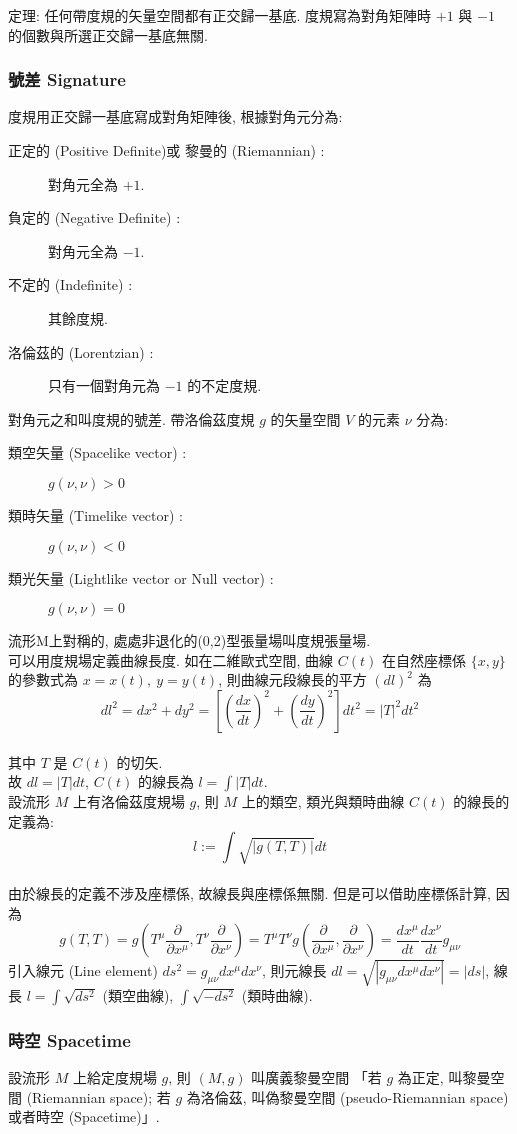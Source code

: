 \documentclass{article}
\begin{document}
\begin{CJK}{UTF8}{bsmi}
定理: 任何帶度規的矢量空間都有正交歸一基底. 度規寫為對角矩陣時 $+1$ 與 $-1$ 的個數與所選正交歸一基底無關.
\subsubsection{號差 Signature}
度規用正交歸一基底寫成對角矩陣後, 根據對角元分為:\begin{description}
  \item[正定的 (Positive Definite)或 黎曼的 (Riemannian) :] 對角元全為 $+1$.
  \item[負定的 (Negative Definite) :] 對角元全為 $-1$.
  \item[不定的 (Indefinite) :] 其餘度規.
  \item[洛倫茲的 (Lorentzian) :] 只有一個對角元為 $-1$ 的不定度規.
\end{description}
對角元之和叫度規的號差.
帶洛倫茲度規 $g$ 的矢量空間 $V$ 的元素 $\nu$ 分為:
\begin{description}
  \item[類空矢量 (Spacelike vector) :] $g(\nu,\nu)>0$
   \item[類時矢量 (Timelike vector) :] $g(\nu,\nu)<0$
    \item[類光矢量 (Lightlike vector or Null vector) :] $g(\nu,\nu)=0$
\end{description}
流形M上對稱的, 處處非退化的(0,2)型張量場叫度規張量場.
\\ 可以用度規場定義曲線長度. 如在二維歐式空間, 曲線 $C(t)$ 在自然座標係 $\{ x, y\}$ 的參數式為 $x=x(t),\ y=y(t)$, 則曲線元段線長的平方 $(dl)^2$ 為 $$dl^2=dx^2+dy^2=[(\frac{dx}{dt})^2+(\frac{dy}{dt})^2]dt^2=|T |^2dt^2  $$
\\其中 $T$ 是 $C(t)$ 的切矢.
\\故 $dl=|T|dt$, $C(t)$ 的線長為 $l=\int |T|dt$.
\\ 設流形 $M$ 上有洛倫茲度規場 $g$, 則 $M$ 上的類空, 類光與類時曲線 $C(t)$ 的線長的定義為: $$ l:= \int \sqrt{|g(T,T)|}dt$$
\\ 由於線長的定義不涉及座標係, 故線長與座標係無關. 但是可以借助座標係計算, 因為 $$g(T,T)=g(T^\mu \frac{\partial}{\partial x^\mu},T^\nu \frac{\partial}{\partial x^\nu})=T^\mu T^\nu g(\frac{\partial}{\partial x^\mu}, \frac{\partial}{\partial x^\nu})=\frac{dx^\mu}{dt} \frac{dx^\nu}{dt}g_{\mu \nu}$$
引入線元 (Line element) $ds^2=g_{\mu\nu}dx^\mu dx^\nu$, 則元線長 $dl=\sqrt{|g_{\mu \nu }dx^\mu dx^\nu|}=|ds|$, 線長 $l=\int \sqrt{ds^2}$ (類空曲線), $\int \sqrt{-ds^2}$ (類時曲線).
\subsubsection{時空 Spacetime}
設流形 $M$ 上給定度規場 $g$, 則 $(M,g)$ 叫廣義黎曼空間 「若 $g$ 為正定, 叫黎曼空間 (Riemannian space); 若 $g$ 為洛倫茲, 叫偽黎曼空間 (pseudo-Riemannian space) 或者時空 (Spacetime)」.

\end{CJK}
\end{document}
